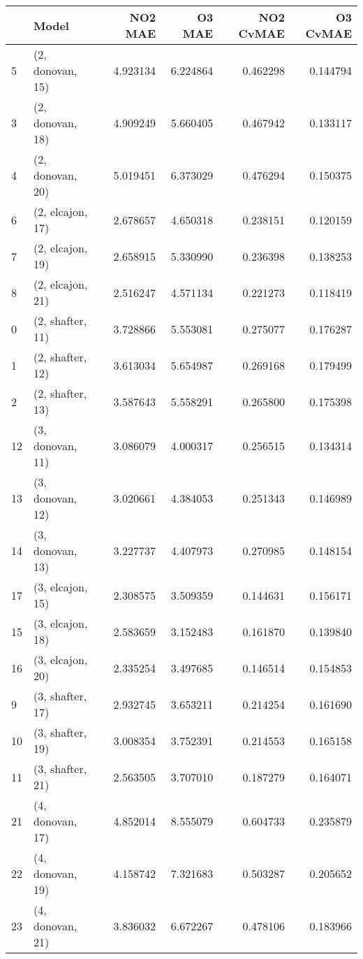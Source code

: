 \begin{tabular}{llrrrr}
\toprule
{} &             Model &    NO2 MAE &     O3 MAE &  NO2 CvMAE &  O3 CvMAE \\
\midrule
5  &  (2, donovan, 15) &   4.923134 &   6.224864 &   0.462298 &  0.144794 \\
3  &  (2, donovan, 18) &   4.909249 &   5.660405 &   0.467942 &  0.133117 \\
4  &  (2, donovan, 20) &   5.019451 &   6.373029 &   0.476294 &  0.150375 \\
6  &  (2, elcajon, 17) &   2.678657 &   4.650318 &   0.238151 &  0.120159 \\
7  &  (2, elcajon, 19) &   2.658915 &   5.330990 &   0.236398 &  0.138253 \\
8  &  (2, elcajon, 21) &   2.516247 &   4.571134 &   0.221273 &  0.118419 \\
0  &  (2, shafter, 11) &   3.728866 &   5.553081 &   0.275077 &  0.176287 \\
1  &  (2, shafter, 12) &   3.613034 &   5.654987 &   0.269168 &  0.179499 \\
2  &  (2, shafter, 13) &   3.587643 &   5.558291 &   0.265800 &  0.175398 \\
12 &  (3, donovan, 11) &   3.086079 &   4.000317 &   0.256515 &  0.134314 \\
13 &  (3, donovan, 12) &   3.020661 &   4.384053 &   0.251343 &  0.146989 \\
14 &  (3, donovan, 13) &   3.227737 &   4.407973 &   0.270985 &  0.148154 \\
17 &  (3, elcajon, 15) &   2.308575 &   3.509359 &   0.144631 &  0.156171 \\
15 &  (3, elcajon, 18) &   2.583659 &   3.152483 &   0.161870 &  0.139840 \\
16 &  (3, elcajon, 20) &   2.335254 &   3.497685 &   0.146514 &  0.154853 \\
9  &  (3, shafter, 17) &   2.932745 &   3.653211 &   0.214254 &  0.161690 \\
10 &  (3, shafter, 19) &   3.008354 &   3.752391 &   0.214553 &  0.165158 \\
11 &  (3, shafter, 21) &   2.563505 &   3.707010 &   0.187279 &  0.164071 \\
21 &  (4, donovan, 17) &   4.852014 &   8.555079 &   0.604733 &  0.235879 \\
22 &  (4, donovan, 19) &   4.158742 &   7.321683 &   0.503287 &  0.205652 \\
23 &  (4, donovan, 21) &   3.836032 &   6.672267 &   0.478106 &  0.183966 \\

\end{tabular}
